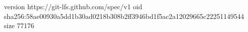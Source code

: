 version https://git-lfs.github.com/spec/v1
oid sha256:58ae00930a5dd1b30ad0218b308b2ff3946bd1f5ac2a12029665c22251149544
size 77176

